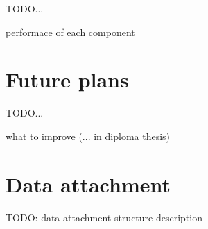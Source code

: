 \documentclass[a4paper, 12pt, twoside]{fithesis2}		%
\renewcommand{\_}{\leavevmode \kern0.0em\vbox{\hrule width0.4em}}
\begin{document}
TODO...

performace of each component

\chapter{Future plans}
\label{chap:future}

TODO...

what to improve (... in diploma thesis)





\appendix


\printbibliography

\chapter{Data attachment}

TODO: data attachment structure description
\end{document}
